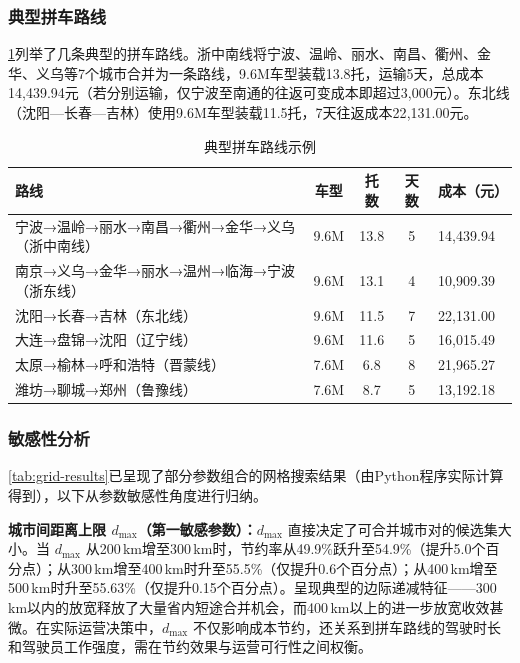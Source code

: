 \subsubsection{典型拼车路线}

\cref{tab:example-routes}列举了几条典型的拼车路线。浙中南线将宁波、温岭、丽水、南昌、衢州、金华、义乌等7个城市合并为一条路线，9.6M车型装载13.8托，运输5天，总成本14{,}439.94元（若分别运输，仅宁波至南通的往返可变成本即超过3{,}000元）。东北线（沈阳—长春—吉林）使用9.6M车型装载11.5托，7天往返成本22{,}131.00元。

\begin{table}[!h]
    \centering
    \begin{tabular}{lcccl}
        \toprule[1.5pt]
        路线 & 车型 & 托数 & 天数 & 成本（元）\\
        \midrule[1pt]
        宁波→温岭→丽水→南昌→衢州→金华→义乌（浙中南线）& 9.6M & 13.8 & 5 & 14{,}439.94 \\
        南京→义乌→金华→丽水→温州→临海→宁波（浙东线）& 9.6M & 13.1 & 4 & 10{,}909.39 \\
        沈阳→长春→吉林（东北线）& 9.6M & 11.5 & 7 & 22{,}131.00 \\
        大连→盘锦→沈阳（辽宁线）& 9.6M & 11.6 & 5 & 16{,}015.49 \\
        太原→榆林→呼和浩特（晋蒙线）& 7.6M & 6.8 & 8 & 21{,}965.27 \\
        潍坊→聊城→郑州（鲁豫线）& 7.6M & 8.7 & 5 & 13{,}192.18 \\
        \bottomrule[1.5pt]
    \end{tabular}\caption{典型拼车路线示例}
    \label{tab:example-routes}

\end{table}

\subsubsection{敏感性分析}

\cref{tab:grid-results}已呈现了部分参数组合的网格搜索结果（由Python程序实际计算得到），以下从参数敏感性角度进行归纳。

\textbf{城市间距离上限 $d_{\max}$（第一敏感参数）：}$d_{\max}$ 直接决定了可合并城市对的候选集大小。当 $d_{\max}$ 从200\,km增至300\,km时，节约率从49.9\%跃升至54.9\%（提升5.0个百分点）；从300\,km增至400\,km时升至55.5\%（仅提升0.6个百分点）；从400\,km增至500\,km时升至55.63\%（仅提升0.15个百分点）。呈现典型的边际递减特征——300\,km以内的放宽释放了大量省内短途合并机会，而400\,km以上的进一步放宽收效甚微。在实际运营决策中，$d_{\max}$ 不仅影响成本节约，还关系到拼车路线的驾驶时长和驾驶员工作强度，需在节约效果与运营可行性之间权衡。

